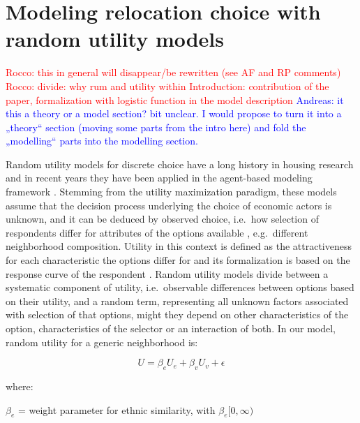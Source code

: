 \documentclass[
]{article}
\begin{document}
\hypertarget{modeling-relocation-choice-with-random-utility-models}{%
\section{Modeling relocation choice with random utility
models}\label{modeling-relocation-choice-with-random-utility-models}}

{\textcolor{red}{Rocco: this in general will disappear/be rewritten (see AF and RP comments)}}
{\textcolor{red}{Rocco: divide: why rum and utility within Introduction: contribution of the paper, formalization with logistic function in the model description}} 
\textcolor{blue}{{Andreas: }it this a theory or a model section? bit unclear. I  would propose to turn it into a „theory“ section (moving some parts from the intro here) and fold the „modelling“ parts into the modelling section.}

Random utility models for discrete choice have a long history in housing
research \citep{frankhauser2016deciding} and in recent years they have
been applied in the agent-based modeling framework
\citep{bruch2006neighborhood,bruch2012methodological}. Stemming from the
utility maximization paradigm, these models assume that the decision
process underlying the choice of economic actors is unknown, and it can
be deduced by observed choice, i.e.~how selection of respondents differ
for attributes of the options available \citep{hess2018revisiting},
e.g.~different neighborhood composition. Utility in this context is
defined as the attractiveness for each characteristic the options differ
for and its formalization is based on the response curve of the
respondent \citep{bruch2015agent,train2009discrete}. Random utility
models divide between a systematic component of utility, i.e.~observable
differences between options based on their utility, and a random term,
representing all unknown factors associated with selection of that
options, might they depend on other characteristics of the option,
characteristics of the selector or an interaction of both. In our model,
random utility for a generic neighborhood is:

\begin{equation}
    U = \beta_e U_e + \beta_v U_v + \epsilon
\end{equation}

where:

\par

\(\beta_e\) = weight parameter for ethnic similarity, with
\(\beta_e [0, \infty)\)
\end{document}

